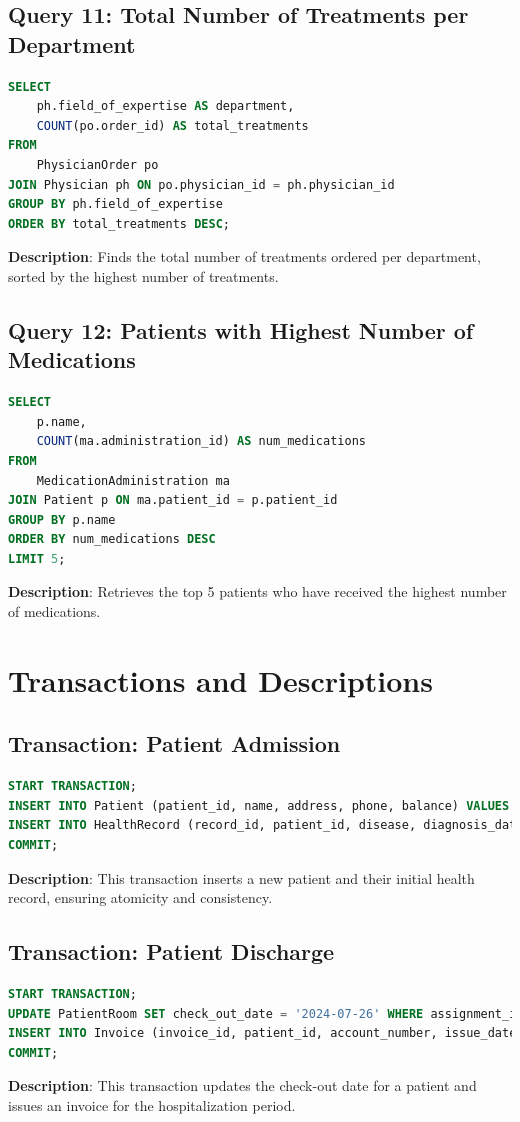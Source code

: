 \documentclass{article}
\begin{document}
\subsection{Query 11: Total Number of Treatments per Department}
\begin{lstlisting}[language=SQL]
SELECT 
    ph.field_of_expertise AS department,
    COUNT(po.order_id) AS total_treatments
FROM 
    PhysicianOrder po
JOIN Physician ph ON po.physician_id = ph.physician_id
GROUP BY ph.field_of_expertise
ORDER BY total_treatments DESC;
\end{lstlisting}
\textbf{Description}: Finds the total number of treatments ordered per department, sorted by the highest number of treatments.

\subsection{Query 12: Patients with Highest Number of Medications}
\begin{lstlisting}[language=SQL]
SELECT 
    p.name,
    COUNT(ma.administration_id) AS num_medications
FROM 
    MedicationAdministration ma
JOIN Patient p ON ma.patient_id = p.patient_id
GROUP BY p.name
ORDER BY num_medications DESC
LIMIT 5;
\end{lstlisting}
\textbf{Description}: Retrieves the top 5 patients who have received the highest number of medications.

\section{Transactions and Descriptions}
\subsection{Transaction: Patient Admission}
\begin{lstlisting}[language=SQL]
START TRANSACTION;
INSERT INTO Patient (patient_id, name, address, phone, balance) VALUES (6, 'John Doe', '123 Elm St', '555-1234', 0);
INSERT INTO HealthRecord (record_id, patient_id, disease, diagnosis_date, status, description) VALUES (1, 6, 'Flu', '2024-07-26', 'ongoing', 'Patient shows flu symptoms');
COMMIT;
\end{lstlisting}
\textbf{Description}: This transaction inserts a new patient and their initial health record, ensuring atomicity and consistency.

\subsection{Transaction: Patient Discharge}
\begin{lstlisting}[language=SQL]
START TRANSACTION;
UPDATE PatientRoom SET check_out_date = '2024-07-26' WHERE assignment_id = 1;
INSERT INTO Invoice (invoice_id, patient_id, account_number, issue_date, start_date, end_date) VALUES (1, 1, 'ACC001', '2024-07-26', '2024-07-01', '2024-07-26');
COMMIT;
\end{lstlisting}
\textbf{Description}: This transaction updates the check-out date for a patient and issues an invoice for the hospitalization period.
\end{document}
